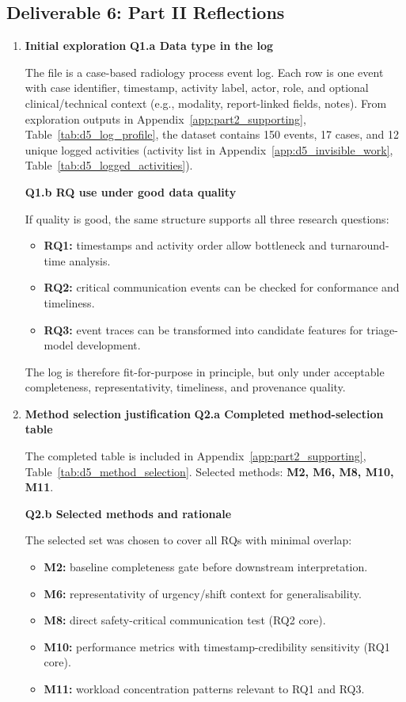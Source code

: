 \subsection{Deliverable 6: Part II Reflections}
\label{sec:deliverable6}

\begin{enumerate}
\item \textbf{Initial exploration}
\textbf{Q1.a Data type in the log}\par
The file is a case-based radiology process event log. Each row is one event with case identifier, timestamp, activity label, actor, role, and optional clinical/technical context (e.g., modality, report-linked fields, notes). From exploration outputs in Appendix~\ref{app:part2_supporting}, Table~\ref{tab:d5_log_profile}, the dataset contains 150 events, 17 cases, and 12 unique logged activities (activity list in Appendix~\ref{app:d5_invisible_work}, Table~\ref{tab:d5_logged_activities}).

\textbf{Q1.b RQ use under good data quality}\par
If quality is good, the same structure supports all three research questions:
\begin{itemize}
  \item \textbf{RQ1:} timestamps and activity order allow bottleneck and turnaround-time analysis.
  \item \textbf{RQ2:} critical communication events can be checked for conformance and timeliness.
  \item \textbf{RQ3:} event traces can be transformed into candidate features for triage-model development.
\end{itemize}
The log is therefore fit-for-purpose in principle, but only under acceptable completeness, representativity, timeliness, and provenance quality.

\item \textbf{Method selection justification}
\textbf{Q2.a Completed method-selection table}\par
The completed table is included in Appendix~\ref{app:part2_supporting}, Table~\ref{tab:d5_method_selection}. Selected methods: \textbf{M2, M6, M8, M10, M11}.

\textbf{Q2.b Selected methods and rationale}\par
The selected set was chosen to cover all RQs with minimal overlap:
\begin{itemize}
  \item \textbf{M2:} baseline completeness gate before downstream interpretation.
  \item \textbf{M6:} representativity of urgency/shift context for generalisability.
  \item \textbf{M8:} direct safety-critical communication test (RQ2 core).
  \item \textbf{M10:} performance metrics with timestamp-credibility sensitivity (RQ1 core).
  \item \textbf{M11:} workload concentration patterns relevant to RQ1 and RQ3.
\end{itemize}


\end{enumerate}
